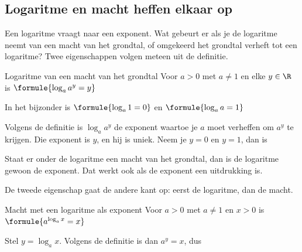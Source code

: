 \begin{oefeningen}
\end{oefeningen}

\subsection{Logaritme en macht heffen elkaar op}

Een logaritme vraagt naar een exponent. Wat gebeurt er als je de logaritme neemt van een macht van het grondtal, of omgekeerd het grondtal verheft tot een logaritme? Twee eigenschappen volgen meteen uit de definitie.

\begin{theorie}
\begin{stelling}{Logaritme van een macht van het grondtal}
Voor $a > 0$ met $a \neq 1$ en elke $y \in \R$ is \qquad $\formule{\log_a a^y = y}$

In het bijzonder is \qquad $\formule{\log_a 1 = 0}$ \qquad en \qquad $\formule{\log_a a = 1}$
\end{stelling}
\begin{bewijs}
Volgens de definitie is $\log_a a^y$ de exponent waartoe je $a$ moet verheffen om $a^y$ te krijgen. Die exponent is $y$, en hij is uniek. Neem je $y = 0$ en $y = 1$, dan is
\end{bewijs}
\end{theorie}

Staat er onder de logaritme een macht van het grondtal, dan is de logaritme gewoon de exponent. Dat werkt ook als de exponent een uitdrukking is.


\begin{oefeningen}
\end{oefeningen}

De tweede eigenschap gaat de andere kant op: eerst de logaritme, dan de macht.

\begin{theorie}
\begin{stelling}{Macht met een logaritme als exponent}
Voor $a > 0$ met $a \neq 1$ en $x > 0$ is \qquad $\formule{a^{\log_a x} = x}$
\end{stelling}
\begin{bewijs}
Stel $y = \log_a x$. Volgens de definitie is dan $a^y = x$, dus
\end{bewijs}
\end{theorie}

